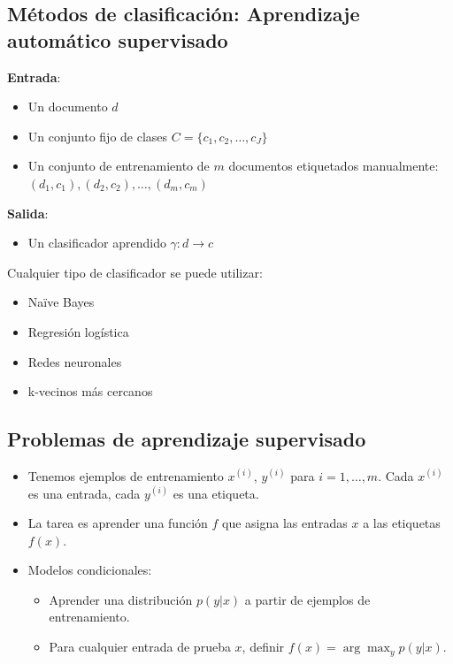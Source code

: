 \documentclass[11pt,fleqn]{book} %
\begin{document}
\subsection{Métodos de clasificación: Aprendizaje automático supervisado}

\textbf{Entrada}:
\begin{itemize}
    \item Un documento $d$
    \item Un conjunto fijo de clases $C = \{c_1, c_2, \ldots, c_J\}$
    \item Un conjunto de entrenamiento de $m$ documentos etiquetados manualmente: $(d_1, c_1), (d_2, c_2), \ldots, (d_m, c_m)$
\end{itemize}

\textbf{Salida}:
\begin{itemize}
    \item Un clasificador aprendido $\gamma: d \to c$
\end{itemize}

Cualquier tipo de clasificador se puede utilizar:
\begin{itemize}
    \item Naïve Bayes
    \item Regresión logística
    \item Redes neuronales
    \item k-vecinos más cercanos
\end{itemize}

\subsection{Problemas de aprendizaje supervisado}
\begin{itemize}
    \item Tenemos ejemplos de entrenamiento $x^{(i)}$, $y^{(i)}$ para $i = 1, \ldots, m$. Cada $x^{(i)}$ es una entrada, cada $y^{(i)}$ es una etiqueta.
    \item La tarea es aprender una función $f$ que asigna las entradas $x$ a las etiquetas $f(x)$.
    \item Modelos condicionales:
    \begin{itemize}
        \item Aprender una distribución $p(y|x)$ a partir de ejemplos de entrenamiento.
        \item Para cualquier entrada de prueba $x$, definir $f(x) = \arg \max_y p(y|x)$.
    \end{itemize}
\end{itemize}
\end{document}
